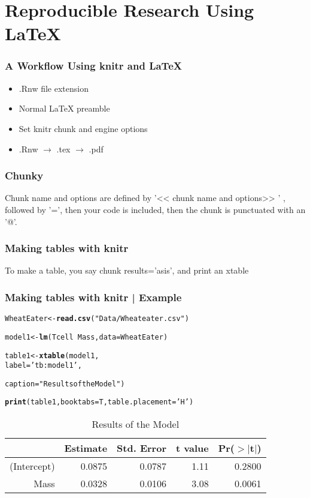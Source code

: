 \documentclass{beamer}\usepackage[]{graphicx}\usepackage[]{color}
\makeatletter
\newcommand{\hlstr}[1]{\textcolor[rgb]{0.192,0.494,0.8}{#1}}%
\newcommand{\hlopt}[1]{\textcolor[rgb]{0,0,0}{#1}}%
\newcommand{\hlstd}[1]{\textcolor[rgb]{0.345,0.345,0.345}{#1}}%
\newcommand{\hlkwb}[1]{\textcolor[rgb]{0.69,0.353,0.396}{#1}}%
\newcommand{\hlkwc}[1]{\textcolor[rgb]{0.333,0.667,0.333}{#1}}%
\newcommand{\hlkwd}[1]{\textcolor[rgb]{0.737,0.353,0.396}{\textbf{#1}}}%
\newenvironment{kframe}{%
 \def\at@end@of@kframe{}%
 \ifinner\ifhmode%
  \def\at@end@of@kframe{\end{minipage}}%
  \begin{minipage}{\columnwidth}%
 \fi\fi%
 \def\FrameCommand##1{\hskip\@totalleftmargin \hskip-\fboxsep
 \colorbox{shadecolor}{##1}\hskip-\fboxsep
     \hskip-\linewidth \hskip-\@totalleftmargin \hskip\columnwidth}%
 \MakeFramed {\advance\hsize-\width
   \@totalleftmargin\z@ \linewidth\hsize
   \@setminipage}}%
 {\par\unskip\endMakeFramed%
 \at@end@of@kframe}
\makeatother
\begin{document}
	\section{Reproducible Research Using \LaTeX}
		\begin{frame}
			\frametitle{A Workflow Using knitr and \LaTeX}
			\begin{itemize}[<+->]
				\item .Rnw file extension
				\item Normal LaTeX preamble
				\item Set knitr chunk and engine options
				\item .Rnw $\rightarrow$ .tex $\rightarrow$ .pdf
			\end{itemize}
		\end{frame}
\begin{frame}
\frametitle{Chunky}
Chunk name and options are defined by '<< chunk name and options>> ' , followed by '=', then your code is included, then the chunk is punctuated with an '@'.
\end{frame}
		\begin{frame}
\frametitle{Making tables with knitr}
To make a table, you say chunk results='asis', and print an xtable
\end{frame}
		\begin{frame}
\frametitle{Making tables with knitr | Example}
\begin{kframe}
\begin{alltt}
\hlstd{WheatEater}\hlkwb{<-} \hlkwd{read.csv}\hlstd{(}\hlstr{"Data/Wheateater.csv"}\hlstd{)}

\hlstd{model1} \hlkwb{<-}\hlkwd{lm}\hlstd{(Tcell}\hlopt{~}\hlstd{Mass,}\hlkwc{data}\hlstd{=WheatEater)}

\hlstd{table1}\hlkwb{<-}\hlkwd{xtable}\hlstd{(model1,}
\hlkwc{label}\hlstd{=}\hlstr{'tb:model1'}\hlstd{,}

\hlkwc{caption}\hlstd{=}\hlstr{"Results of the Model"}\hlstd{)}

\hlkwd{print}\hlstd{(table1,}\hlkwc{booktabs}\hlstd{=T,}\hlkwc{table.placement}\hlstd{=}\hlstr{'H'}\hlstd{)}
\end{alltt}
\end{kframe}%
\begin{table}[H]
\centering
\begin{tabular}{rrrrr}
  \toprule
 & Estimate & Std. Error & t value & Pr($>$$|$t$|$) \\ 
  \midrule
(Intercept) & 0.0875 & 0.0787 & 1.11 & 0.2800 \\ 
  Mass & 0.0328 & 0.0106 & 3.08 & 0.0061 \\ 
   \bottomrule
\end{tabular}
\caption{Results of the Model} 
\label{tb:model1}
\end{table}

\end{frame}
\end{document}

